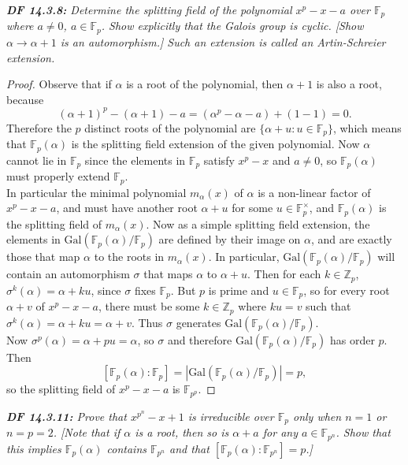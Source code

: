 \documentclass{article}
\begin{document}
\it \textbf{DF 14.3.8:} Determine the splitting field of the polynomial
  $x^p-x-a$ over $\mathbb{F}_p$ where $a\neq0$, $a\in\mathbb{F}_p$. Show
  explicitly that the Galois group is cyclic. [Show
  $\alpha\rightarrow\alpha+1$ is an automorphism.] Such an extension is
  called an Artin-Schreier extension.

  \begin{proof}
    Observe that if $\alpha$ is a root of the polynomial, then $\alpha+1$
    is also a root, because
    \[(\alpha+1)^p-(\alpha+1)-a =(\alpha^p-\alpha-a) +(1-1) =0.\]
    Therefore the $p$ distinct roots of the polynomial are $\{\alpha+u:
    u\in\mathbb{F}_p\}$, which means that $\mathbb{F}_p(\alpha)$ is the
    splitting field extension of the given polynomial. Now $\alpha$ cannot
    lie in $\mathbb{F}_p$ since the elements in $\mathbb{F}_p$ satisfy
    $x^p-x$ and $a\neq0$, so $\mathbb{F}_p(\alpha)$ must properly extend
    $\mathbb{F}_p$. \\

    In particular the minimal polynomial $m_\alpha(x)$ of $\alpha$ is a
    non-linear factor of $x^p-x-a$, and must have another root $\alpha+u$
    for some $u\in\mathbb{F}_p^\times$, and $\mathbb{F}_p(\alpha)$ is the
    splitting field of $m_\alpha(x)$. Now as a simple splitting field
    extension, the elements in
    $\text{Gal}(\mathbb{F}_p(\alpha)/\mathbb{F}_p)$ are defined by their
    image on $\alpha$, and are exactly those that map $\alpha$ to the roots
    in $m_\alpha(x)$. In particular,
    $\text{Gal}(\mathbb{F}_p(\alpha)/\mathbb{F}_p)$ will contain an
    automorphism $\sigma$ that maps $\alpha$ to $\alpha+u$. Then for each
    $k\in\mathbb{Z}_p$, $\sigma^k(\alpha)=\alpha+ku$, since $\sigma$ fixes
    $\mathbb{F}_p$. But $p$ is prime and $u\in\mathbb{F}_p$, so for every
    root $\alpha+v$ of $x^p-x-a$, there must be some $k\in\mathbb{Z}_p$
    where $ku=v$ such that $\sigma^k(\alpha)=\alpha+ku=\alpha+v$. 
    Thus $\sigma$ generates
    $\text{Gal}(\mathbb{F}_p(\alpha)/\mathbb{F}_p)$. \\

    Now $\sigma^p(\alpha)=\alpha+pu=\alpha$, so $\sigma$ and therefore
    $\text{Gal}(\mathbb{F}_p(\alpha)/\mathbb{F}_p)$ has order $p$. Then
    \[[\mathbb{F}_p(\alpha):\mathbb{F}_p]
    =|\text{Gal}(\mathbb{F}_p(\alpha)/\mathbb{F}_p)| =p,\]
    so the splitting field of $x^p-x-a$ is $\mathbb{F}_{p^p}$.
  \end{proof}

\it \textbf{DF 14.3.11:} Prove that $x^{p^n}-x+1$ is irreducible over
  $\mathbb{F}_p$ only when $n=1$ or $n=p=2$. [Note that if $\alpha$ is a
  root, then so is $\alpha+a$ for any $a\in\mathbb{F}_{p^n}$. Show that
  this implies $\mathbb{F}_p(\alpha)$ contains $\mathbb{F}_{p^n}$ and that
  $[\mathbb{F}_p(\alpha):\mathbb{F}_{p^n}]=p$.]
\end{document}
